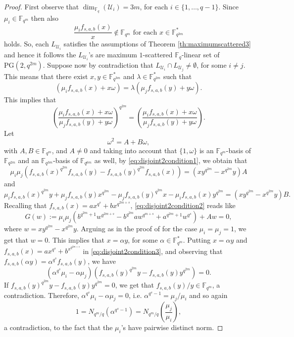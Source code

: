 \documentclass[11pt]{amsart}
\theoremstyle{definition}
\newcommand{\F}{{\mathbb F}}
\newcommand{\U}{{\mathcal{U}}}
\newcommand{\PG}{\mathrm{PG}}
\newcommand{\N}{\mathrm{N}}
\begin{document}
{\begin{proof}
First observe that $\dim_{\F_q}(\U_i)=3m$, for each $i \in \{1,\ldots,q-1\}$. Since $\mu_i \in \F_{q^m}$ then also
\[
\frac{\mu_i f_{s,a,b}(x)}{x} \notin \F_{q^m} \mbox{ for each }x \in \F_{q^{3m}}^*
\]
holds. So, each $L_{\U_i}$ satisfies the assumptions of Theorem \ref{th:maximumscattered3} and hence it follows the $L_{\U_i}$'s are maximum $1$-scattered $\F_q$-linear set of $\PG(2,q^{2m})$. \newline 
Suppose now by contradiction that $L_{\U_i} \cap L_{\U_j} \neq \emptyset$, for some $i \neq j$. This means that there exist $x,y \in \F_{q^{3m}}^*$ and $\lambda \in \F_{q^{2m}}^*$ such that 
\[
(\mu_i f_{s,a,b}(x)+x\omega)=\lambda(\mu_j f_{s,a,b}(y)+y\omega).
\]
This implies that 
\begin{equation} \label{eq:disjoint2condition1}
\left( \frac{\mu_if_{s,a,b}(x)+x\omega}{\mu_jf_{s,a,b}(y)+y\omega}\right)^{q^{2m}}= \left( \frac{\mu_if_{s,a,b}(x)+x\omega}{\mu_jf_{s,a,b}(y)+y\omega}\right).
\end{equation}
Let
\[
\omega^2=A+B\omega, 
\]
with $A,B \in \F_{q^m}$, and $A \neq 0$ and taking into account that $\{1,\omega\}$ is an $\F_{q^m}$-basis of $\F_{q^{2m}}$ and an $\F_{q^{3m}}$-basis of $\F_{q^{6m}}$ as well, by \eqref{eq:disjoint2condition1}, we obtain that
\begin{equation} \label{eq:disjoint2condition2}
    \mu_i\mu_j (f_{s,a,b}(x)^{q^{2m}}f_{s,a,b}(y)- f_{s,a,b}(y)^{q^{2m}}f_{s,a,b}(x)) =(xy^{q^{2m}}-x^{q^{2m}}y)A
\end{equation}
and 
\begin{equation} \label{eq:disjoint2condition3}
    \mu_i f_{s,a,b}(x)^{q^{2m}} y+ \mu_j f_{s,a,b}(y) x^{q^{2m}} - \mu_j f_{s,a,b}(y)^{q^{2m}}x-\mu_i f_{s,a,b}(x)y^{q^{2m}} =(xy^{q^{2m}}-x^{q^{2m}}y)B.
\end{equation}
Recalling that $f_{s,a,b}(x)=ax^{q^s}+b{x^{q^{2m+s}}}$, \eqref{eq:disjoint2condition2} reads like
\[
G(w):=\mu_i\mu_j( b^{q^{2m}+1}w^{q^{2m+s}}- b^{q^{2m}}aw^{q^{m+s}} +a^{q^{2m}+1}w^{q^{s}}) +Aw=0,
\]
where $w=xy^{q^{2m}}-x^{q^{2m}}y$. 
Arguing as in the proof of \cite[Proposition 2.7]{bartoli2018maximum} for the case $\mu_i=\mu_j=1$, we get that $w=0$.
This implies that $x=\alpha y$, for some $\alpha \in \F_{q^m}^*$. Putting $x=\alpha y$ and $f_{s,a,b}(x)=ax^{q^s}+b^{x^{q^{2m+s}}}$ in \eqref{eq:disjoint2condition3}, and observing that $f_{s,a,b}(\alpha y)=\alpha^{q^s}f_{s,a,b}(y)$, we have
\[
(\alpha^{q^s}\mu_i-\alpha \mu_j)(f_{s,a,b}(y)^{q^{2m}}y-f_{s,a,b}(y)y^{q^{2m}})=0.
\]
If $f_{s,a,b}(y)^{q^{2m}}y-f_{s,a,b}(y)y^{q^{2m}}=0$, we get that $f_{s,a,b}(y)/y \in \F_{q^{m}}$, a contradiction.
Therefore, $\alpha^{q^s}\mu_i-\alpha \mu_j = 0$, i.e. $\alpha^{q^s-1}=\mu_j/\mu_i$ and so again 
\[
1=N_{q^{m}/q}(\alpha^{q^s-1})=N_{q^{m}/q}\left(\frac{\mu_j}{\mu_i}\right),
\]
a contradiction, to the fact that the $\mu_i$'s have pairwise distinct norm.
\end{proof}




}
\end{document}

